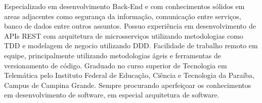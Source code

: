 \begin{cvletter}
  Especializado em desenvolvimento Back-End e com conhecimentos sólidos em areas adjacentes como segurança da informação, comunicação entre serviços, banco de dados entre outros assuntos.
  Possuo experiência em desenvolvimento de APIs REST com arquitetura de microsserviços utilizando metodologias como TDD e modelagem de negocio utilizando DDD.
  Facilidade de trabalho remoto em equipe, principalmente utilizando metodologias ágeis e ferramentas de versionamento de código.
  Graduado no curso superior de Tecnologia em Telemática pelo Instituto Federal de Educação, Ciência e Tecnologia da Paraíba, Campus de Campina Grande.
  Sempre procurando aperfeiçoar os conhecimentos em desenvolvimento de software, em especial arquitetura de software.

\end{cvletter}